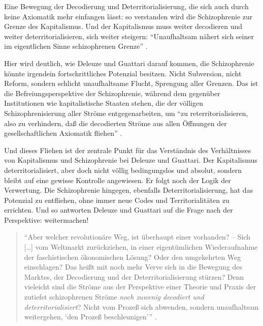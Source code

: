 \documentclass[12pt,
               DIV13,
               paper=a4,
               twoside=false,
               onehalfspacing,
               bibliography=totoc,
               toc=graduated,
               draft,
               ]{scrartcl}
\newcommand{\lips}{\dots\unkern}
\newcommand{\pc}[2]{\parencite[#1]{#2}}
\newcommand{\worries}[1]{\ifdraft{\textcolor{blue}{\texttt{(#1)}}}{}}
\newcommand{\dg}{Deleuze und Guattari\xspace}
\begin{document}
Eine Bewegung der Decodierung und Deterritorialisierung, die sich auch
durch keine Axiomatik mehr einfangen lässt: so verstanden wird die
Schizophrenie zur Grenze des Kapitalismus. Und der Kapitalismus muss
weiter decodieren und weiter deterritorialisieren, sich weiter
steigern: "`Unaufhaltsam nähert sich seiner im eigentlichen Sinne
schizophrenen Grenze"' \pc{44}{ao}.

Hier wird deutlich, wie \dg darauf kommen, die Schizophrenie könnte
irgendein fortschrittliches Potenzial besitzen. Nicht Subversion,
nicht Reform, sondern schlicht unaufhaltsame Flucht, Sprengung aller
Grenzen. Das ist die Befreiungsperspektive der Schizophrenie, während
dem gegenüber Institutionen wie kapitalistische Staaten stehen, die
der völligen Schizophrenisierung aller Ströme entgegenarbeiten, um
"`zu reterritorialisieren, also zu verhindern, daß die decodierten
Ströme aus allen Öffnungen der gesellschaftlichen Axiomatik fliehen"'
\pc{332}{ao}.

Und dieses Fliehen ist der zentrale Punkt für das Verständnis des
Verhältnisses von Kapitalismus und Schizophrenie bei Deleuze und
Guattari. Der Kapitalismus deterritorialisiert, aber doch nicht völlig
bedingungslos und absolut, sondern bleibt auf eine gewisse Kontrolle
angewiesen. Er folgt noch der Logik der Verwertung. Die Schizophrenie
hingegen, ebenfalls Deterritorialisierung, hat das Potenzial zu
entfliehen, ohne immer neue Codes und Territorialitäten zu errichten.
Und so antworten Deleuze und Guattari auf die Frage nach der
Perspektive: weitermachen!
%
\begin{spacing}{1}
\begin{quote}
\enquote{Aber welcher revolutionäre Weg, ist
überhaupt einer vorhanden? -- Sich [\lips] vom Weltmarkt zurückziehen,
in einer eigentümlichen Wiederaufnahme der faschistischen \glq
ökonomischen Lösung\grq? Oder den umgekehrten Weg einschlagen? Das
heißt mit noch mehr Verve sich in die Bewegung des Marktes, der
Decodierung und der Deterritorialisierung stürzen? Denn vieleicht sind
die Ströme aus der Perspektive einer Theorie und Praxis der
zutiefst schizophrenen Ströme \emph{noch zuwenig decodiert und
deterritorialisiert}? Nicht vom Prozeß sich abwenden, sondern
unaufhaltsam weitergehen, \enquote{den Prozeß beschleunigen}}
\pc{S. 308, meine Hervorh.}{ao}.
\worries{Ende doch eine Relativierung? also raus?}
\end{quote}
\end{spacing}
\end{document}

